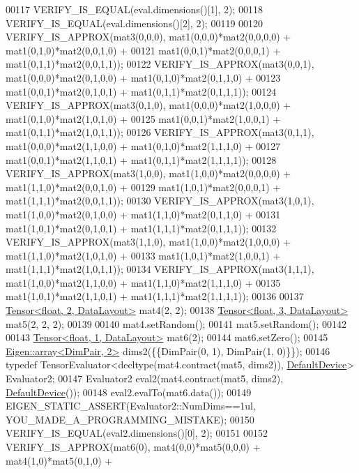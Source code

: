 \begin{DoxyCode}
00117   VERIFY\_IS\_EQUAL(eval.dimensions()[1], 2);
00118   VERIFY\_IS\_EQUAL(eval.dimensions()[2], 2);
00119 
00120   VERIFY\_IS\_APPROX(mat3(0,0,0), mat1(0,0,0)*mat2(0,0,0,0) + mat1(0,1,0)*mat2(0,0,1,0) +
00121                                 mat1(0,0,1)*mat2(0,0,0,1) + mat1(0,1,1)*mat2(0,0,1,1));
00122   VERIFY\_IS\_APPROX(mat3(0,0,1), mat1(0,0,0)*mat2(0,1,0,0) + mat1(0,1,0)*mat2(0,1,1,0) +
00123                                 mat1(0,0,1)*mat2(0,1,0,1) + mat1(0,1,1)*mat2(0,1,1,1));
00124   VERIFY\_IS\_APPROX(mat3(0,1,0), mat1(0,0,0)*mat2(1,0,0,0) + mat1(0,1,0)*mat2(1,0,1,0) +
00125                                 mat1(0,0,1)*mat2(1,0,0,1) + mat1(0,1,1)*mat2(1,0,1,1));
00126   VERIFY\_IS\_APPROX(mat3(0,1,1), mat1(0,0,0)*mat2(1,1,0,0) + mat1(0,1,0)*mat2(1,1,1,0) +
00127                                 mat1(0,0,1)*mat2(1,1,0,1) + mat1(0,1,1)*mat2(1,1,1,1));
00128   VERIFY\_IS\_APPROX(mat3(1,0,0), mat1(1,0,0)*mat2(0,0,0,0) + mat1(1,1,0)*mat2(0,0,1,0) +
00129                                 mat1(1,0,1)*mat2(0,0,0,1) + mat1(1,1,1)*mat2(0,0,1,1));
00130   VERIFY\_IS\_APPROX(mat3(1,0,1), mat1(1,0,0)*mat2(0,1,0,0) + mat1(1,1,0)*mat2(0,1,1,0) +
00131                                 mat1(1,0,1)*mat2(0,1,0,1) + mat1(1,1,1)*mat2(0,1,1,1));
00132   VERIFY\_IS\_APPROX(mat3(1,1,0), mat1(1,0,0)*mat2(1,0,0,0) + mat1(1,1,0)*mat2(1,0,1,0) +
00133                                 mat1(1,0,1)*mat2(1,0,0,1) + mat1(1,1,1)*mat2(1,0,1,1));
00134   VERIFY\_IS\_APPROX(mat3(1,1,1), mat1(1,0,0)*mat2(1,1,0,0) + mat1(1,1,0)*mat2(1,1,1,0) +
00135                                 mat1(1,0,1)*mat2(1,1,0,1) + mat1(1,1,1)*mat2(1,1,1,1));
00136 
00137   \hyperlink{class_eigen_1_1_tensor}{Tensor<float, 2, DataLayout>} mat4(2, 2);
00138   \hyperlink{class_eigen_1_1_tensor}{Tensor<float, 3, DataLayout>} mat5(2, 2, 2);
00139 
00140   mat4.setRandom();
00141   mat5.setRandom();
00142 
00143   \hyperlink{class_eigen_1_1_tensor}{Tensor<float, 1, DataLayout>} mat6(2);
00144   mat6.setZero();
00145   \hyperlink{class_eigen_1_1array}{Eigen::array<DimPair, 2>} dims2(\{\{DimPair(0, 1), DimPair(1, 0)\}\});
00146   \textcolor{keyword}{typedef} TensorEvaluator<decltype(mat4.contract(mat5, dims2)), \hyperlink{struct_eigen_1_1_default_device}{DefaultDevice}> Evaluator2;
00147   Evaluator2 eval2(mat4.contract(mat5, dims2), \hyperlink{struct_eigen_1_1_default_device}{DefaultDevice}());
00148   eval2.evalTo(mat6.data());
00149   EIGEN\_STATIC\_ASSERT(Evaluator2::NumDims==1ul, YOU\_MADE\_A\_PROGRAMMING\_MISTAKE);
00150   VERIFY\_IS\_EQUAL(eval2.dimensions()[0], 2);
00151 
00152   VERIFY\_IS\_APPROX(mat6(0), mat4(0,0)*mat5(0,0,0) + mat4(1,0)*mat5(0,1,0) +

\end{DoxyCode}
